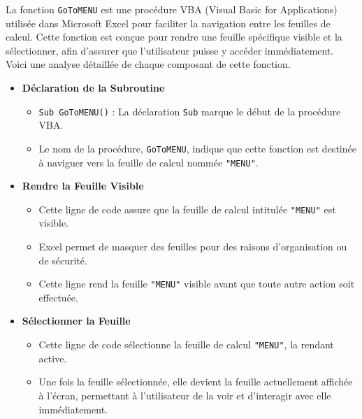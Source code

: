 \documentclass[a4paper, oneside, 12pt, final]{extreport}
\begin{document}
La fonction \texttt{GoToMENU} est une procédure VBA (Visual Basic for Applications) utilisée dans Microsoft Excel pour faciliter la navigation entre les feuilles de calcul. Cette fonction est conçue pour rendre une feuille spécifique visible et la sélectionner, afin d'assurer que l'utilisateur puisse y accéder immédiatement. Voici une analyse détaillée de chaque composant de cette fonction.
\begin{itemize}

\item\textbf{Déclaration de la Subroutine}
\begin{itemize}
    \item \texttt{Sub GoToMENU()} : La déclaration \texttt{Sub} marque le début de la procédure VBA.
    \item Le nom de la procédure, \texttt{GoToMENU}, indique que cette fonction est destinée à naviguer vers la feuille de calcul nommée \texttt{"MENU"}.
\end{itemize}

\item\textbf{Rendre la Feuille Visible}
\begin{itemize}
    \item Cette ligne de code assure que la feuille de calcul intitulée \texttt{"MENU"} est visible.
    \item Excel permet de masquer des feuilles pour des raisons d'organisation ou de sécurité.
    \item Cette ligne rend la feuille \texttt{"MENU"} visible avant que toute autre action soit effectuée.
\end{itemize}

\item\textbf{Sélectionner la Feuille}
\begin{itemize}
    \item Cette ligne de code sélectionne la feuille de calcul \texttt{"MENU"}, la rendant active.
    \item Une fois la feuille sélectionnée, elle devient la feuille actuellement affichée à l'écran, permettant à l'utilisateur de la voir et d'interagir avec elle immédiatement.
\end{itemize}
\end{itemize}
\end{document}
